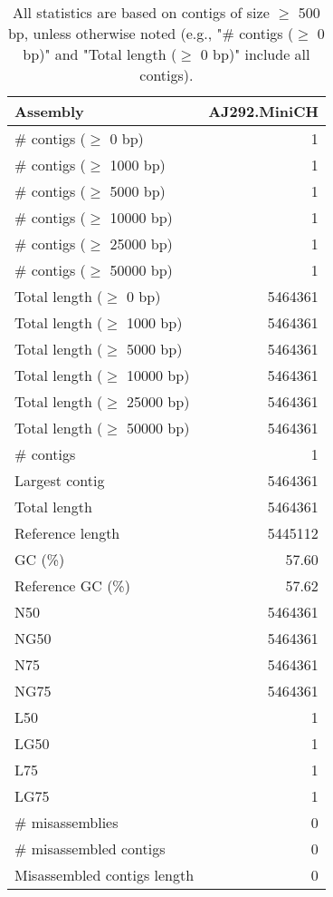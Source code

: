 \documentclass[12pt,a4paper]{article}
\begin{document}
\begin{table}[ht]
\begin{center}
\caption{All statistics are based on contigs of size $\geq$ 500 bp, unless otherwise noted (e.g., "\# contigs ($\geq$ 0 bp)" and "Total length ($\geq$ 0 bp)" include all contigs).}
\begin{tabular}{|l*{1}{|r}|}
\hline
Assembly & AJ292.MiniCH \\ \hline
\# contigs ($\geq$ 0 bp) & 1 \\ \hline
\# contigs ($\geq$ 1000 bp) & 1 \\ \hline
\# contigs ($\geq$ 5000 bp) & 1 \\ \hline
\# contigs ($\geq$ 10000 bp) & 1 \\ \hline
\# contigs ($\geq$ 25000 bp) & 1 \\ \hline
\# contigs ($\geq$ 50000 bp) & 1 \\ \hline
Total length ($\geq$ 0 bp) & 5464361 \\ \hline
Total length ($\geq$ 1000 bp) & 5464361 \\ \hline
Total length ($\geq$ 5000 bp) & 5464361 \\ \hline
Total length ($\geq$ 10000 bp) & 5464361 \\ \hline
Total length ($\geq$ 25000 bp) & 5464361 \\ \hline
Total length ($\geq$ 50000 bp) & 5464361 \\ \hline
\# contigs & 1 \\ \hline
Largest contig & 5464361 \\ \hline
Total length & 5464361 \\ \hline
Reference length & 5445112 \\ \hline
GC (\%) & 57.60 \\ \hline
Reference GC (\%) & 57.62 \\ \hline
N50 & 5464361 \\ \hline
NG50 & 5464361 \\ \hline
N75 & 5464361 \\ \hline
NG75 & 5464361 \\ \hline
L50 & 1 \\ \hline
LG50 & 1 \\ \hline
L75 & 1 \\ \hline
LG75 & 1 \\ \hline
\# misassemblies & 0 \\ \hline
\# misassembled contigs & 0 \\ \hline
Misassembled contigs length & 0 \\ \hline

\end{tabular}
\end{center}
\end{table}
\end{document}
